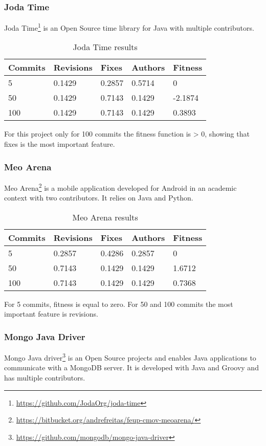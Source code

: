 \subsubsection{Joda Time}
Joda Time\footnote{\url{https://github.com/JodaOrg/joda-time}} is an Open Source
time library for Java with multiple contributors.

\begin{table}[H]
    \centering
    \caption{Joda Time results}
    \label{table:learning_jodatime}
    \begin{tabular}{|l|l|l|l|l|}
        \hline
        Commits & Revisions & Fixes & Authors & Fitness \\ \hline
        5 & 0.1429 & 0.2857 & 0.5714 & 0 \\ \hline
        50 & 0.1429 & 0.7143 & 0.1429 & -2.1874 \\ \hline
        100 & 0.1429 & 0.7143 & 0.1429 & 0.3893 \\ \hline
    \end{tabular}
\end{table}
For this project only for 100 commits the fitness function is > 0, showing that
fixes is the most important feature.

\subsubsection{Meo Arena}
Meo Arena\footnote{\url{https://bitbucket.org/andrefreitas/feup-cmov-meoarena/}}
is a mobile application developed for Android in an academic context with two
contributors. It relies on Java and Python.

\begin{table}[H]
    \centering
    \caption{Meo Arena results}
    \label{table:learning_meoarena}
    \begin{tabular}{|l|l|l|l|l|}
        \hline
        Commits & Revisions & Fixes & Authors & Fitness \\ \hline
        5 & 0.2857 & 0.4286 & 0.2857 & 0 \\ \hline
        50 & 0.7143 & 0.1429 & 0.1429 & 1.6712 \\ \hline
        100 & 0.7143 & 0.1429 & 0.1429 & 0.7368 \\ \hline
    \end{tabular}
\end{table}

For 5 commits, fitness is equal to zero. For 50 and 100 commits the most
important feature is revisions.

\subsubsection{Mongo Java Driver}
Mongo Java driver\footnote{\url{https://github.com/mongodb/mongo-java-driver}}
is an Open Source projects and enables Java applications to communicate with a
MongoDB server. It is developed with Java and Groovy and has multiple
contributors.

